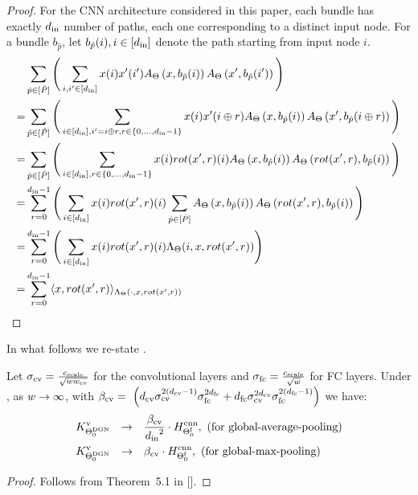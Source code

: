 \begin{proof}
For the CNN architecture considered in this paper, each bundle has exactly $d_{\text{in}}$ number of paths, each one corresponding to a distinct input node. For a bundle $b_{\hat{p}}$, let $b_{\hat{p}}(i),i\in[d_{\text{in}}]$ denote the path starting from input node $i$.
\begin{align*}
&\sum_{\hat{p}\in [\hat{P}]} \Bigg(\sum_{i,i'\in[d_{\text{in}}]} x(i) x'(i') A_{\Theta}\left(x,b_{\hat{p}}(i)\right) A_{\Theta}\left(x',b_{\hat{p}}(i')\right) \Bigg)\\
=&\sum_{\hat{p}\in [\hat{P}]}\Bigg(\sum_{i\in[d_{\text{in}}],i'=i\oplus r, r\in\{0,\ldots,d_{\text{in}}-1\}} x(i) x'(i\oplus r) A_{\Theta}\left(x,b_{\hat{p}}(i)\right) A_{\Theta}\left(x',b_{\hat{p}}(i\oplus r)\right)\Bigg)\\
=&\sum_{\hat{p}\in [\hat{P}]}\Bigg(\sum_{i\in[d_{\text{in}}], r\in\{0,\ldots,d_{\text{in}}-1\}} x(i) rot(x',r)(i) A_{\Theta}\left(x,b_{\hat{p}}(i)\right) A_{\Theta}\left(rot(x',r),b_{\hat{p}}(i)\right)\Bigg)\\
=&\sum_{r=0}^{d_{\text{in}}-1} \Bigg(\sum_{i\in[d_{\text{in}}]} x(i) rot(x',r)(i) \sum_{\hat{p}\in [\hat{P}]}  A_{\Theta}\left(x,b_{\hat{p}}(i)\right) A_{\Theta}\left(rot(x',r),b_{\hat{p}}(i)\right)\Bigg)\\
=&\sum_{r=0}^{d_{\text{in}}-1}\Bigg(\sum_{i\in[d_{\text{in}}]} x(i) rot(x',r)(i) \Lambda_{\Theta}(i,x,rot(x',r))\Bigg)\\
=&\sum_{r=0}^{d_{\text{in}}-1} \langle x,rot(x',r)\rangle_{\Lambda_{\Theta}(\cdot,x,rot(x',r))}
\end{align*}
\end{proof}


In what follows we re-state .

\begin{theorem} Let $\sigma_{\text{cv}}=\frac{c_{\text{scale}}}{\sqrt{ww_{\text{cv}}}}$ for the convolutional layers and $\sigma_{\text{fc}}=\frac{c_{\text{scale}}}{\sqrt{w}}$ for FC layers. Under , as $w\rightarrow\infty$, with  $\beta_{\text{cv}} = \ \left(d_{\text{cv}} \sigma_{\text{cv}}^{2(d_{\text{cv}}-1)}\sigma_{\text{fc}}^{2d_{\text{fc}}}+d_{\text{fc}} \sigma_{\text{cv}}^{2d_{\text{cv}}}\sigma_{\text{fc}}^{2(d_{\text{fc}}-1)}\right)$ we have:
\begin{align*}
&K^{\text{v}}_{\Theta^{\text{DGN}}_0}&\rightarrow&\quad \frac{\beta_{\text{cv}}}{{d_{\text{in}}}^2} \cdot H^{\text{cnn}}_{\Theta^{\textrm{f}}_0},\,\,\text{(for global-average-pooling)}\\
&K^{\text{v}}_{\Theta^{\text{DGN}}_0}&\rightarrow& \quad{\beta_{\text{cv}}} \cdot H^{\text{cnn}}_{\Theta^{\textrm{f}}_0},\,\,\text{(for global-max-pooling)}\\
\end{align*}
\end{theorem}

\begin{proof}
Follows from Theorem~5.1 in [].
\end{proof}

